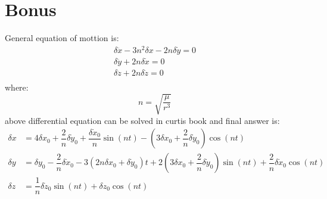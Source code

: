 \section{Bonus}
General equation of mottion is:
\begin{equation*}
    \begin{split}
        \delta \ddot{x} -3n^2\delta x - 2n\delta \dot{y} = 0\\
        \delta \ddot{y} + 2n\delta \dot{x} = 0\\
        \delta \ddot{z} + 2n\delta \dot{z} = 0\\ 
    \end{split}
\end{equation*}
where:
$$
n = \sqrt{\dfrac{\mu}{r^3}}
$$
above differential equation can be solved in curtis book and final answer is:
\begin{equation*}
    \begin{split}
        \delta x &= 4\delta x_0 + \dfrac{2}{n}\delta \dot y_0 + \dfrac{\delta \dot x_0}{n}\sin(nt)-
        \left(3\delta x_0 + \dfrac{2}{n} \delta \dot y_0\right)\cos(nt)\\
        \delta y &= \delta y_0 -  \dfrac{2}{n}\delta \dot x_0 - 3(2n\delta x_0+ \delta \dot y_0)t + 2\left(3\delta x_0 + \dfrac{2}{n} \delta \dot y_0\right)\sin(nt) + \dfrac{2}{n}\delta \dot x_0\cos(nt)\\
        \delta z &= \dfrac{1}{n}\delta \dot z_0 \sin(nt)+\delta z_0 \cos(nt) \\
    \end{split}
\end{equation*}

